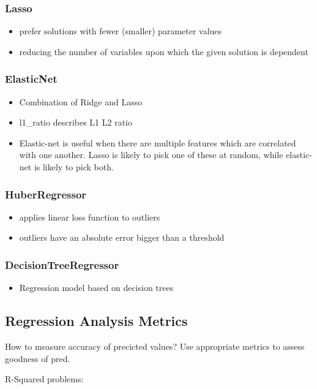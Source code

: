 \subsubsection{Lasso}
\begin{itemize}
	\item prefer solutions with fewer (smaller) parameter values
	\item reducing the number of variables upon which the given solution is dependent
\end{itemize}
\subsubsection{ElasticNet}
\begin{itemize}
	\item Combination of Ridge and Lasso
	\item l1\_ratio describes L1 L2 ratio
	\item Elastic-net is useful when there are multiple features which are correlated with one another. Lasso is likely to pick one of these at random, while elastic-net is likely to pick both.
\end{itemize}
\subsubsection{HuberRegressor}
\begin{itemize}
	\item applies linear loss function to outliers
	\item outliers have an absolute error bigger than a threshold
\end{itemize}
\subsubsection{DecisionTreeRegressor}
\begin{itemize}
	\item Regression model based on decision trees
\end{itemize}


\subsection{Regression Analysis Metrics}

How to measure accuracy of precicted values?
Use appropriate metrics to assess goodness of pred.



R-Squared problems: 

